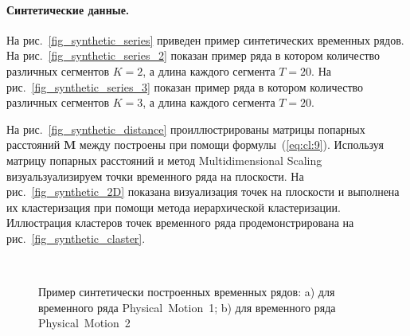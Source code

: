 \documentclass[12pt, twoside]{article}
\numberwithin{equation}{section}
\begin{document}
\paragraph{Синтетические данные.}


На рис.~\ref{fig_synthetic_series} приведен пример синтетических временных рядов. На рис.~\ref{fig_synthetic_series_2} показан пример ряда в котором количество различных сегментов $K = 2$, а длина каждого сегмента $T = 20$. На рис.~\ref{fig_synthetic_series_3} показан пример ряда в котором количество различных сегментов $K = 3$, а длина каждого сегмента $T = 20$. 

На рис.~\ref{fig_synthetic_distance} проиллюстрированы матрицы попарных расстояний $\textbf{M}$ между построены при помощи формулы~(\ref{eq:cl:9}). Используя матрицу попарных расстояний и метод Multidimensional Scaling~\cite{Borg2005} визуальзуализируем точки временного ряда на плоскости. На рис.~\ref{fig_synthetic_2D} показана визуализация точек на плоскости и выполнена их кластеризация при помощи метода иерархической кластеризации. Иллюстрация кластеров точек временного ряда продемонстрирована на рис.~\ref{fig_synthetic_claster}.

\begin{figure}[h!t]\center
{}
\\
\caption{Пример синтетически построенных временных рядов: a) для временного ряда Physical~Motion~1; b) для временного ряда Physical~Motion~2}
\label{fig_real_series}
\end{figure}
\end{document}
